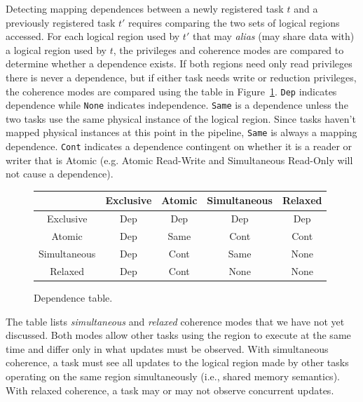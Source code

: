 Detecting mapping dependences between a newly registered task $t$ and
a previously registered task $t'$ requires comparing the two sets of
logical regions accessed.  For each logical region used by $t'$ that
may {\em alias} (may share data with) a logical region used by $t$, the privileges and
coherence modes are compared to determine whether a dependence exists.
If both regions need only read privileges there is never a dependence,
but if either task needs write or reduction privileges, the coherence
modes are compared using the table in Figure~\ref{fig:dependence}.
{\tt Dep} indicates dependence while {\tt None}
indicates independence.  {\tt Same} is a dependence unless the two tasks
use the same physical instance of the logical region.  Since tasks
haven't mapped physical instances at this point in the pipeline,
{\tt Same} is always a mapping dependence.
{\tt Cont} 
indicates a dependence contingent on whether it is a reader or
writer that is Atomic (e.g. Atomic Read-Write and Simultaneous
Read-Only will not cause a dependence).


\begin{figure}
{\small
\begin{tabular}{c|cccc}
             & Exclusive & Atomic   & Simultaneous & Relaxed \\
\midrule
Exclusive    & Dep & Dep & Dep & Dep \\ 
Atomic       & Dep & Same & Cont & Cont \\
Simultaneous & Dep & Cont & Same & None \\
Relaxed      & Dep & Cont & None & None \\
\end{tabular}
}
\vspace{-2mm}
\caption{Dependence table. \label{fig:dependence}}
\vspace{-6mm}
\end{figure}

The table lists {\em simultaneous} and {\em relaxed} coherence modes
that we have not yet discussed.  Both modes
allow other tasks using the region to execute at the same time and differ
only in what updates must be observed.  With simultaneous coherence, a task must 
see all updates to the logical region made by other tasks operating on the same region 
simultaneously (i.e., shared memory semantics).  With relaxed coherence, 
a task may or may not observe concurrent updates.



